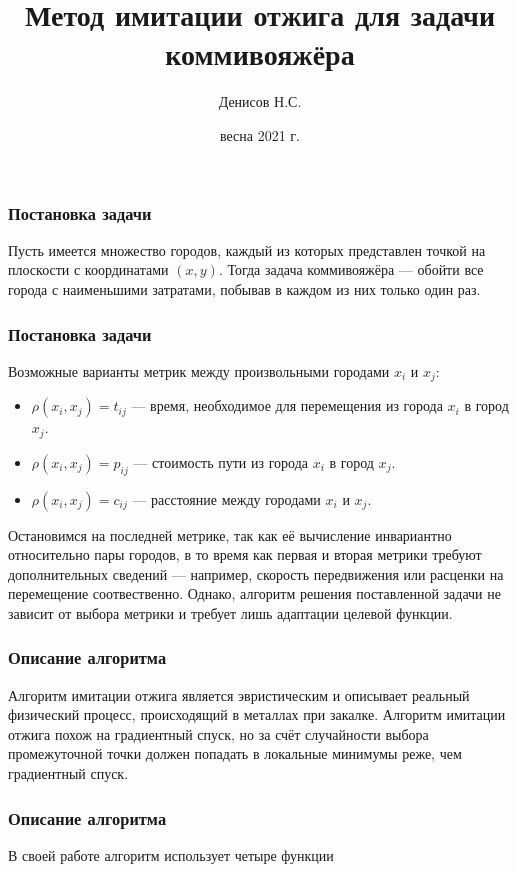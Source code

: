 \documentclass[12pt]{beamer}
\begin{document}
	\title[Презентация по практическому заданию]{Метод имитации отжига для задачи коммивояжёра}
	\author[Денисов Н.С.]{Денисов Н.С.}
	\date{весна 2021 г.}
	\begin{frame}[plain]
	\maketitle
\end{frame}

\begin{frame}
\frametitle{Постановка задачи}
Пусть имеется множество городов, каждый из которых представлен точкой на плоскости с координатами $(x, y)$. Тогда задача коммивояжёра --- обойти все города с наименьшими затратами, побывав в каждом из них только один раз.
\end{frame}

\begin{frame}
\frametitle{Постановка задачи}
Возможные варианты метрик между произвольными городами $x_{i}$ и $x_{j}$:
\begin{itemize}
\item $\rho(x_{i}, x_{j}) = t_{ij}$ --- время, необходимое для перемещения из города $x_{i}$ в город $x_{j}$.
\item $\rho(x_{i}, x_{j}) = p_{ij}$ --- стоимость пути из города $x_{i}$ в город $x_{j}$.
\item $\rho(x_{i}, x_{j}) = c_{ij}$ --- расстояние между городами $x_{i}$ и $x_{j}$.
\end{itemize}
Остановимся на последней метрике, так как её вычисление инвариантно относительно пары городов, в то время как первая и вторая метрики требуют дополнительных сведений --- например, скорость передвижения или расценки на перемещение соотвественно. Однако, алгоритм решения поставленной задачи не зависит от выбора метрики и требует лишь адаптации целевой функции.
\end{frame}

\begin{frame}
\frametitle{Описание алгоритма}
Алгоритм имитации отжига является эвристическим и описывает реальный физический процесс, происходящий в металлах при закалке. Алгоритм имитации отжига похож на градиентный спуск, но за счёт случайности выбора промежуточной точки должен попадать в локальные минимумы реже, чем градиентный спуск.
\end{frame}

\begin{frame}
\frametitle{Описание алгоритма}
\begin{center}
В своей работе алгоритм использует четыре функции
\end{center}
\end{frame}
\end{document}
